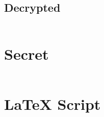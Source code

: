 \documentclass[12pt]{article}
\begin{document}
\subsection{Decrypted}
\label{Decrypted SubSection}

\inputminted[breaklines,linenos,bgcolor=AliceBlue]{python3}{plaintext.txt.enc.dec.txt}


\section{Secret}
\label{Secret Section}

\inputminted[breaklines,linenos,bgcolor=AliceBlue]{python3}{secret.txt.dec.txt}


\pagebreak
\section{LaTeX Script}
\label{LaTeX Script Section}
\inputminted[breaklines]{tex}{main.tex}

\end{document}
